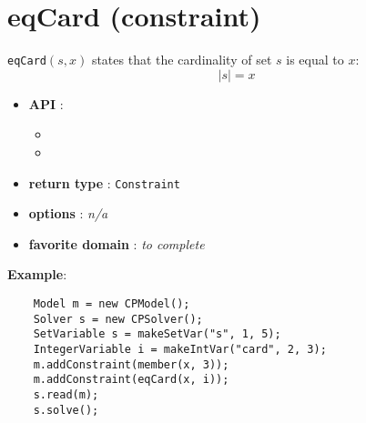 \label{eqcard}
\hypertarget{eqcard}{}

\section{eqCard (constraint)}\label{eqcard:eqcardconstraint}\hypertarget{eqcard:eqcardconstraint}{}
\begin{notedef}
  \texttt{eqCard}$(s,x)$ states that the cardinality of set $s$ is equal to $x$:
$$|s| = x$$
\end{notedef}

\begin{itemize}
	\item \textbf{API} :
	\begin{itemize}
		\item {}
		\item {}
	\end{itemize}
	\item \textbf{return type} : \texttt{Constraint}
	\item \textbf{options} : \emph{n/a}
	\item \textbf{favorite domain} : \emph{to complete}
\end{itemize}

\textbf{Example}:
\begin{lstlisting}
	Model m = new CPModel();
	Solver s = new CPSolver();
	SetVariable s = makeSetVar("s", 1, 5);
	IntegerVariable i = makeIntVar("card", 2, 3);
	m.addConstraint(member(x, 3));
	m.addConstraint(eqCard(x, i));
	s.read(m);
	s.solve();
\end{lstlisting}
